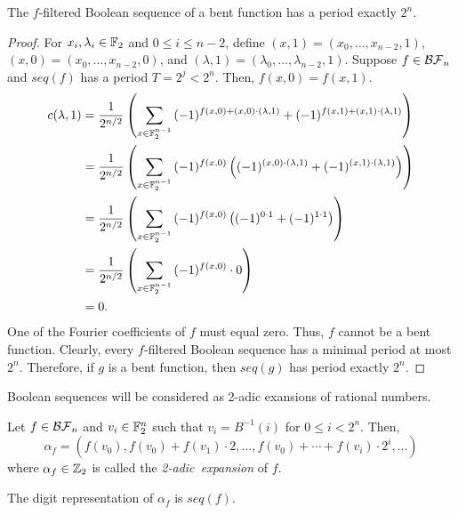 \begin{theorem}
  The $f$-filtered Boolean sequence of a bent function has a period
  exactly $2^n$.
\end{theorem}
\begin{proof}
  For $x_i,\lambda_i\in\mathbb{F}_2$ and $0\leq i\leq n-2$, define
  $(x,1)=\allowbreak(x_0,\dots,\allowbreak x_{n-2},1)$,
  $(x,0)=\allowbreak(x_0,\dots,\allowbreak x_{n-2},0)$, and
  $(\lambda,1)=\allowbreak(\lambda_0,\dots,\allowbreak \lambda_{n-2},1)$.
  Suppose $f\in\mathcal{BF}_n$ and $seq(f)$ has a period $T=2^j<2^n$. Then,
  $f(x,0)=f(x,1)$.
  {\allowdisplaybreaks
  \begin{align*}
    c(\lambda,1)&=\frac{1}{2^{n/2}}
      \left(\sum_{x\in\mathbb{F}_2^{n-1}}
        {(-1)^{f(x,0)+(x,0)\cdot(\lambda,1)}+
        (-1)^{f(x,1)+(x,1)\cdot(\lambda,1)}}
      \right)\\
    &=\frac{1}{2^{n/2}}
      \left(\sum_{x\in\mathbb{F}_2^{n-1}}
        {(-1)^{f(x,0)}\left((-1)^{(x,0)\cdot(\lambda,1)}+
        (-1)^{(x,1)\cdot(\lambda,1)}\right)}
      \right)\\
    &=\frac{1}{2^{n/2}}
      \left(\sum_{x\in\mathbb{F}_2^{n-1}}
      {(-1)^{f(x,0)}\left((-1)^{0\cdot1}+(-1)^{1\cdot1}\right)}
      \right)\\
    &=\frac{1}{2^{n/2}}
      \left(\sum_{x\in\mathbb{F}_2^{n-1}}{(-1)^{f(x,0)}\cdot0}\right)\\
    &=0.
  \end{align*}
  }
  One of the Fourier coefficients of $f$ must equal zero. Thus, $f$ cannot
  be a bent function. Clearly, every $f$-filtered Boolean sequence has a
  minimal period at most $2^n$. Therefore, if $g$ is a bent function, then
  $seq(g)$ has period exactly $2^n$.
\end{proof}

\par Boolean sequences will be considered as 2-adic exansions of rational
numbers.

\begin{definition}\label{2-adic-ex}
  Let $f\in\mathcal{BF}_n$ and $v_i\in\mathbb{F}_2^n$ such that $v_i=B^{-1}(i)$ for
  $0\leq i<2^n$. Then,
  \begin{equation}
    \alpha_f=(f(v_0),f(v_0)+f(v_1)\cdot2,\dots,\allowbreak
      f(v_0)+\cdots\allowbreak+f(v_i)\cdot2^i,\allowbreak\dots)
  \end{equation}
  where $\alpha_f\in\mathbb{Z}_2$ is called the {\em 2-adic\ expansion} of $f$.
\end{definition}

\begin{lemma}
  The digit representation of $\alpha_f$ is $seq(f)$.
\end{lemma}

